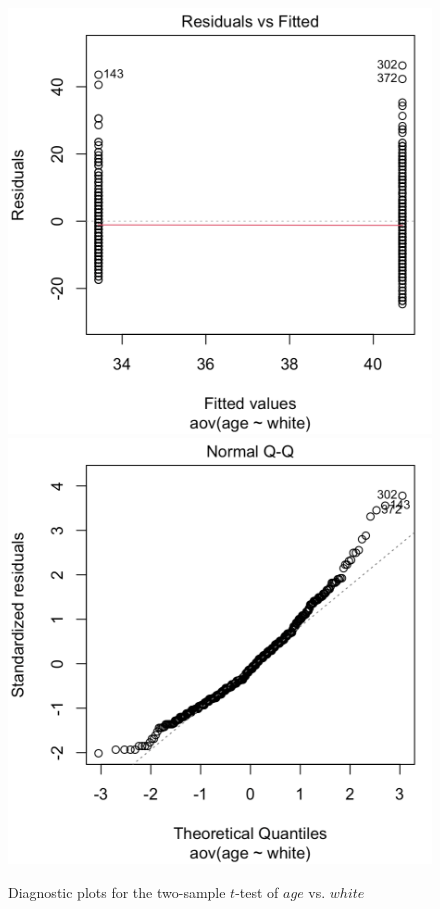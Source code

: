 \begin{figure}[h]
    \centering
    \includegraphics[scale=.4]{ttest1_plot1.png}
    \includegraphics[scale=.4]{ttest1_plot2.png}
    \caption{Diagnostic plots for the two-sample $t$-test of $age$ vs. $white$}
    \label{fig:ttest1_plots}
\end{figure}

